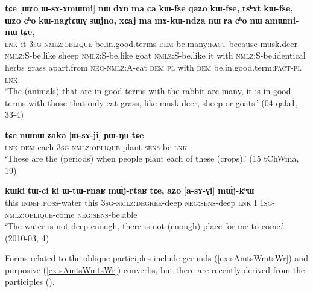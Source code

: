 \documentclass[oneside,a4paper,11pt]{article}
\newcommand{\ipa}[1]{\textbf{{\phon\mbox{#1}}}} %
\begin{document}
\begin{exe}
   \ex \label{ex:WsAmWmi}
 \gll 
\ipa{tɕe}   	[\ipa{ɯʑo}   	\ipa{ɯ-sɤ-ɤmɯmi}]  	\ipa{nɯ}   	\ipa{dɤn}   	\ipa{ma}   	\ipa{ca}   	\ipa{kɯ-fse}   	\ipa{qaʑo}   	\ipa{kɯ-fse,}   	\ipa{tsʰɤt}   	\ipa{kɯ-fse,}   	 \ipa{ɯʑo}   	\ipa{cʰo}   	\ipa{kɯ-naχtɕɯɣ}   	\ipa{sɯjno,}   	\ipa{xɕaj}   	\ipa{ma}   	\ipa{mɤ-kɯ-ndza}   	\ipa{nɯ} \ipa{ra}   	\ipa{cʰo}   	\ipa{nɯ}   	\ipa{amɯmi-nɯ}   	\ipa{tɕe,}   \\
\textsc{lnk} it \textsc{3sg-nmlz:oblique}-be.in.good.terms \textsc{dem} be.many:\textsc{fact} because musk.deer \textsc{nmlz:S}-be.like sheep \textsc{nmlz:S}-be.like goat  \textsc{nmlz:S}-be.like it with  \textsc{nmlz:S}-be.identical herbs grass apart.from \textsc{neg-nmlz:A}-eat \textsc{dem} \textsc{pl} with \textsc{dem} be.in.good.term:\textsc{fact}-\textsc{pl} \textsc{lnk} \\
\glt `The (animals) that are in good terms with the rabbit are many, it is in good terms with those that only eat grass, like musk deer, sheep or goats.' (04 qala1, 33-4)
\end{exe}

\begin{exe}
   \ex \label{ex:WsAji}
   \gll
   \ipa{tɕe} 	\ipa{nɯnɯ} 	\ipa{ʑaka} 	[\ipa{ɯ-sɤ-ji}] 	\ipa{ɲɯ-ŋu} 	\ipa{tɕe}\\
   \textsc{lnk} \textsc{dem} each \textsc{3sg-nmlz:oblique}-plant \textsc{sens}-be \textsc{lnk}\\
\glt `These are the (periods) when people plant each of these (crops).' (15 tChWma, 19)
\end{exe}

\begin{exe}
   \ex \label{ex:asAGi}
 \gll
\ipa{kɯki}   	\ipa{tɯ-ci}   	\ipa{ki}   	\ipa{ɯ-tɯ-rnaʁ}   	\ipa{mɯ́j-rtaʁ}   	\ipa{tɕe,}   	\ipa{aʑo}   	[\ipa{a-sɤ-ɣi}]   	\ipa{mɯ́j-kʰɯ}   \\
this \textsc{indef.poss}-water this \textsc{3sg-nmlz:degree}-deep \textsc{neg:sens}-deep \textsc{lnk} I \textsc{1sg-nmlz:oblique}-come \textsc{neg:sens}-be.able \\
\glt `The water is not deep enough, there is not (enough) place for me to come.' (2010-03, 4)
\end{exe}

Forms related to the oblique participles include gerunds (\ref{ex:sAmtsWmtsWr}) and purposive  (\ref{ex:sAmtsWmtsWr}) converbs, but there are recently derived from the participles (\citealt[272-273]{jacques14linking}).
\end{document}
